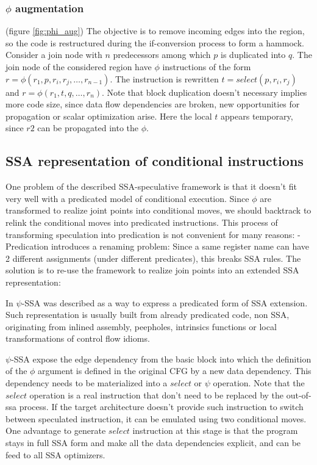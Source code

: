\subsubsection{$\phi$ augmentation} (figure \ref{fig:phi_aug})
The objective is to remove incoming edges into the region, so the code is restructured during the if-conversion process to form a hammock. Consider a join node with $n$ predecessors among which $p$ is duplicated into $q$.  The join node of the considered region have $\phi$ instructions of the form $r=\phi(r_1,p,r_i,r_j,\dots,r_{n-1})$. The instruction is rewritten $t=select(p,r_i,r_j)$ and \mbox{$r=\phi(r_1,t,q,\dots,r_n)$}. 
Note that block duplication doesn't necessary implies more code size, since data flow dependencies are broken, new opportunities for propagation or scalar optimization arise. Here the local $t$ appears temporary, since $r2$ can be propagated into the $\phi$.

\subsection{SSA representation of conditional instructions}

One problem of the described SSA-speculative framework is that it doesn't fit very well with a predicated model of conditional execution. Since $\phi$ are transformed to realize joint points into conditional moves, we should backtrack to relink the conditional moves into predicated instructions. This process of transforming speculation into predication is not convenient for many reasons:
- Predication introduces a renaming problem: Since a same register name can have 2 different assignments (under different predicates), this breaks SSA rules. The solution is to re-use the framework to realize join points into an extended SSA representation:

In \cite{Stoutchinin:2001:ESS:563998.564022} $\psi$-SSA was described as a way to express a predicated form of SSA extension. Such representation is usually built from already predicated code, non SSA, originating from inlined assembly, peepholes, intrinsics functions or local transformations of control flow idioms. 

$\psi$-SSA expose the edge dependency from the basic block into which the definition of the $\phi$ argument is defined in the original CFG by a new data dependency. This dependency needs to be materialized into a $select$ or $\psi$ operation. Note that the $select$ operation is a real instruction that don't need to be replaced by the out-of-ssa process. If the target architecture doesn't provide such instruction to switch between speculated instruction, it can be emulated using two conditional moves. One advantage to generate $select$ instruction at this stage is that the program stays in full SSA form and make all the data dependencies explicit, and can be feed to all SSA optimizers. 

